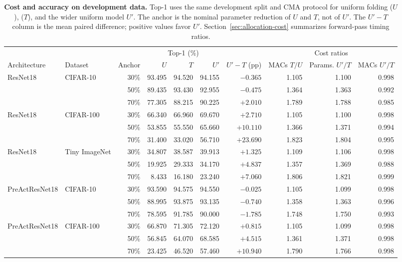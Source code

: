 \begin{table}[tbp]
\centering
\small
\setlength{\tabcolsep}{3.5pt}
\caption{\textbf{Cost and accuracy on development data.} Top-1 uses the same development split and CMA protocol for uniform folding ($U$), \TiltName{} ($T$), and the wider uniform model $U'$. The anchor is the nominal parameter reduction of $U$ and $T$, not of $U'$. The $U'-T$ column is the mean paired difference; positive values favor $U'$. Section~\ref{sec:allocation-cost} summarizes forward-pass timing ratios.}
\label{tab:cost-controls}
\begin{tabular}{@{}llrrrrrrrr@{}}
\toprule
 &  &  & \multicolumn{3}{c}{Top-1 (\%)} &  & \multicolumn{3}{c}{Cost ratios} \\
\cmidrule(lr){4-6}\cmidrule(lr){8-10}
Architecture & Dataset & Anchor & $U$ & $T$ & $U'$ & $U'-T$ (pp) & \shortstack{MACs\\$T/U$} & \shortstack{Params.\\$U'/T$} & \shortstack{MACs\\$U'/T$} \\
\midrule
ResNet18 & CIFAR-10 & 30\% & 93.495 & 94.520 & 94.155 & $-0.365$ & 1.105 & 1.100 & 0.998 \\
 &  & 50\% & 89.435 & 93.430 & 92.955 & $-0.475$ & 1.364 & 1.363 & 0.992 \\
 &  & 70\% & 77.305 & 88.215 & 90.225 & $+2.010$ & 1.789 & 1.788 & 0.985 \\
\addlinespace[2pt]
ResNet18 & CIFAR-100 & 30\% & 66.340 & 66.960 & 69.670 & $+2.710$ & 1.105 & 1.100 & 0.998 \\
 &  & 50\% & 53.855 & 55.550 & 65.660 & $+10.110$ & 1.366 & 1.371 & 0.994 \\
 &  & 70\% & 31.400 & 33.020 & 56.710 & $+23.690$ & 1.823 & 1.804 & 0.995 \\
\addlinespace[2pt]
ResNet18 & Tiny ImageNet & 30\% & 34.807 & 38.587 & 39.913 & $+1.325$ & 1.109 & 1.106 & 0.998 \\
 &  & 50\% & 19.925 & 29.333 & 34.170 & $+4.837$ & 1.357 & 1.369 & 0.988 \\
 &  & 70\% & 8.433 & 16.180 & 23.240 & $+7.060$ & 1.806 & 1.821 & 0.999 \\
\addlinespace[2pt]
PreActResNet18 & CIFAR-10 & 30\% & 93.590 & 94.575 & 94.550 & $-0.025$ & 1.105 & 1.099 & 0.998 \\
 &  & 50\% & 88.995 & 93.875 & 93.135 & $-0.740$ & 1.358 & 1.363 & 0.996 \\
 &  & 70\% & 78.595 & 91.785 & 90.000 & $-1.785$ & 1.748 & 1.750 & 0.993 \\
\addlinespace[2pt]
PreActResNet18 & CIFAR-100 & 30\% & 66.870 & 71.305 & 72.120 & $+0.815$ & 1.105 & 1.099 & 0.998 \\
 &  & 50\% & 56.845 & 64.070 & 68.585 & $+4.515$ & 1.361 & 1.371 & 0.998 \\
 &  & 70\% & 23.425 & 46.520 & 57.460 & $+10.940$ & 1.790 & 1.766 & 0.998 \\
\bottomrule
\end{tabular}
\end{table}

